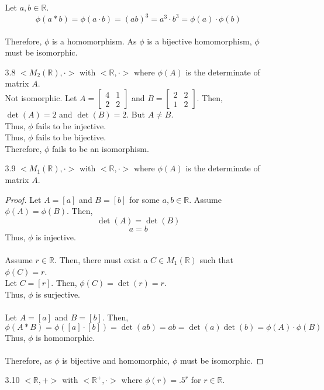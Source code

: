 \documentclass[12pt]{article}
\newcommand{\R}{\mathbb{R}}
\begin{document}
\begin{enumerate}
\begin{enumerate}
			Let $a,b \in \R $. 
			\[\phi(a * b) = \phi(a\cdot b) = (ab)^3 = a^3 \cdot b^3 = \phi(a)\cdot\phi(b) \]\\
			Therefore, $\phi$ is a homomorphism.
			As $\phi$ is a bijective homomorphism, $\phi$ must be isomorphic.
			\item[3.8] $<M_2(\R),\cdot>$ with $<\R,\cdot>$ where $\phi(A)$ is the determinate of matrix $A$.\\
				Not isomorphic. Let $ A = \begin{bmatrix} 
												4 & 1 \\
												2 & 2 
											\end{bmatrix}  $ and 
									$ B = \begin{bmatrix} 
												2 & 2 \\
												1 & 2 
											\end{bmatrix}  $. 
										Then, $ \det(A) = 2$ and $ \det(B) = 2$.
											 But $ A \not = B $. \\
											 Thus, $ \phi $ fails to be injective.\\
											 Thus, $ \phi $ fails to be bijective.\\
											 Therefore, $ \phi $ fails to be an isomorphism.
									 
			\item[3.9] $<M_1(\R),\cdot>$ with $<\R,\cdot>$ where $\phi(A)$ is the determinate of matrix $A$.
				\begin{proof}
					Let $ A=[a]$ and $B=[b]$ for some $a,b\in\R$.
					 Assume $ \phi(A) = \phi(B)$. Then, 
					 	\[\det(A) = \det(B)\]
					 	\[a = b\]
					 	Thus, $ \phi $ is injective.\\
					\\
					 Assume $ r \in \R $. Then, there must exist a $ C \in M_1(\R) $ such that $ \phi(C) = r $.\\
					 Let $ C=[r] $. Then, $ \phi(C)=\det(r)=r $. \\
					 Thus, $ \phi $ is surjective.\\
					 \\
					 Let $ A=[a] $ and $ B=[b] $. Then, 
					 	\[\phi(A*B)=\phi([a]\cdot[b])=\det(ab)=ab=\det(a)\det(b)=\phi(A)\cdot\phi(B)\]
					 Thus, $ \phi $ is homomorphic.\\
					 \\
					 Therefore, as $ \phi $ is bijective and homomorphic, $ \phi $ must be isomorphic.
				\end{proof}
			\item[3.10] $<\R,+>$ with $<\R^+,\cdot>$ where $\phi (r) = .5^r$ for $r \in \R$.
			

\end{enumerate}
\end{enumerate}
\end{document}
